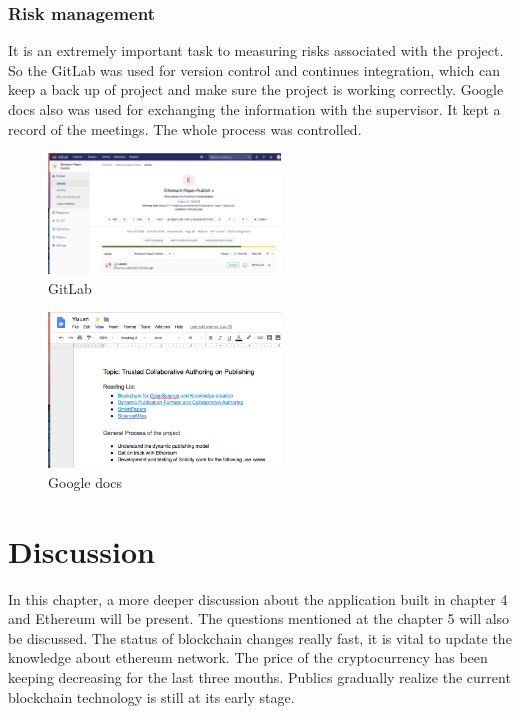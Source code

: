 \documentclass[openany,12pt]{ecsthesis}      %
\begin{document}
\subsection{Risk management}
It is an extremely important task to measuring risks associated with the project. 
So the GitLab \cite{gitlab} was used for version control and continues integration, which can keep a back up of project and make sure the project is working correctly.
Google docs also was used for exchanging the information with the supervisor. It kept a record of the meetings. The whole process was controlled.
\begin{figure}[H]
  \centering
  \includegraphics[width=0.55\textwidth]{gitlab.png}
  \caption{GitLab}
  \label{fxxk4}
\end{figure}
\begin{figure}[H]
  \centering
  \includegraphics[width=0.55\textwidth]{googledoc.png}
  \caption{Google docs}
  \label{fxxk3}
\end{figure}
\chapter{Discussion}
In this chapter, a more deeper discussion 
about the application built in chapter 4 and Ethereum will be present.
The questions mentioned at the chapter 5 will also be discussed.
The status of blockchain changes really fast, it is vital to update the knowledge about ethereum network.
The price of the cryptocurrency has been keeping decreasing for the last three mouths. 
Publics gradually realize the current blockchain technology is still at its early stage.
\end{document}
